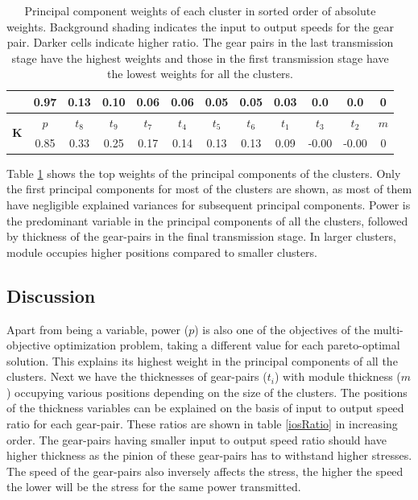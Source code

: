 {{\begin{table}[!ht]
\begin{tabular}{|c|c|c|c|c|c|c|c|c|c|c|c|}
        & 0.97 & 0.13 & 0.10 & 0.06 & 0.06 & 0.05 & 0.05 & 0.03 & 0.0 & 0.0 & 0 \\ 
        \hline
        \multirow{2}{*}{\textbf{K}} & $p$ &\cellcolor[gray]{0.45} $t_8$ & \cellcolor[gray]{0.50} $t_9$ & \cellcolor[gray]{0.65} $t_7$ &\cellcolor[gray]{0.60} $t_4$ &\cellcolor[gray]{0.70} $t_5$ &\cellcolor[gray]{0.75} $t_6$ &\cellcolor[gray]{0.40} $t_1$ &\cellcolor[gray]{0.80} $t_3$ &\cellcolor[gray]{0.55} $t_2$ & $m$ \\
        & 0.85 & 0.33 & 0.25 & 0.17 & 0.14 & 0.13 & 0.13 & 0.09 & -0.00 & -0.00 & 0 \\ 
        \hline
      \end{tabular}
      \caption{Principal component weights of each cluster in sorted order of absolute weights. Background shading indicates the input to output speeds for the gear pair. Darker cells indicate higher ratio. The gear pairs in the last transmission stage have the highest weights and those in the first transmission stage have the lowest weights for all the clusters.}
      \label{gt11pcTopWeights}
    \end{table}
  }
}

Table \ref{gt11pcTopWeights} shows the top weights of the principal
components of the clusters. Only the first principal components for most of
the clusters are shown, as most of them have negligible explained variances
for subsequent principal components. Power is the predominant variable in
the principal components of all the clusters, followed by thickness of the
gear-pairs in the final transmission stage.  In larger clusters, module
occupies higher positions compared to smaller clusters.


\subsection{Discussion}
Apart from being a variable, power ($p$) is also one of the objectives of
the multi-objective optimization problem, taking a different value for each
pareto-optimal solution. This explains its highest weight in the principal
components of all the clusters. Next we have the thicknesses of gear-pairs
($t_i$) with module thickness ($m$) occupying various positions depending
on the size of the clusters. The positions of the thickness variables can
be explained on the basis of input to output speed ratio for each
gear-pair.  These ratios are shown in table \ref{iosRatio} in increasing
order. The gear-pairs having smaller input to output speed ratio should
have higher thickness as the pinion of these gear-pairs has to withstand
higher stresses.  The speed of the gear-pairs also inversely affects the
stress, the higher the speed the lower will be the stress for the same
power transmitted.



